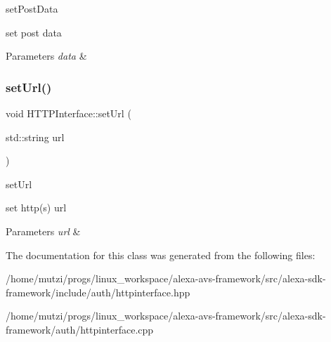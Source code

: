 set\+Post\+Data 

set post data 
\begin{DoxyParams}{Parameters}
{\em data} & \\
\hline
\end{DoxyParams}
\mbox{\label{classAuth_1_1HTTPInterface_afd8f3f0a92345fcece6a4851d8bbe0bf}} 
\subsubsection{\texorpdfstring{set\+Url()}{setUrl()}}
{\footnotesize\ttfamily void H\+T\+T\+P\+Interface\+::set\+Url (\begin{DoxyParamCaption}\item[{std\+::string}]{url }\end{DoxyParamCaption})}



set\+Url 

set http(s) url 
\begin{DoxyParams}{Parameters}
{\em url} & \\
\hline
\end{DoxyParams}


The documentation for this class was generated from the following files\+:\begin{DoxyCompactItemize}
\item 
/home/mutzi/progs/linux\+\_\+workspace/alexa-\/avs-\/framework/src/alexa-\/sdk-\/framework/include/auth/httpinterface.\+hpp\item 
/home/mutzi/progs/linux\+\_\+workspace/alexa-\/avs-\/framework/src/alexa-\/sdk-\/framework/auth/httpinterface.\+cpp\end{DoxyCompactItemize}
